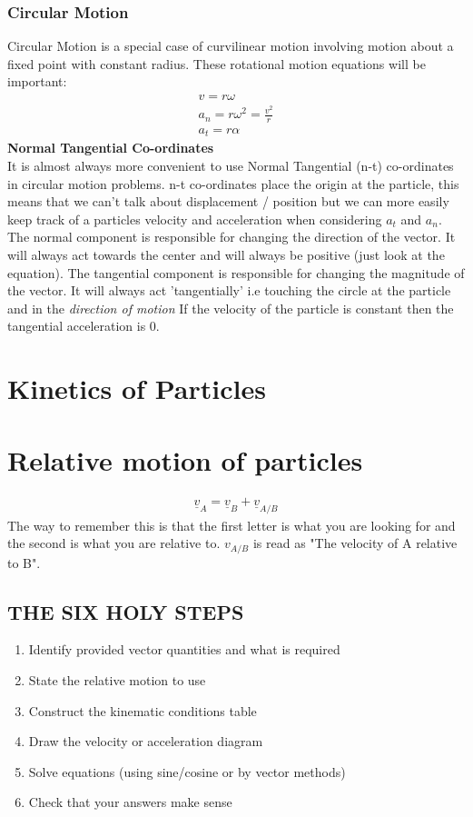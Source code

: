 \documentclass[a4paper, 12pt]{article}
\begin{document}
\subsubsection*{Circular Motion}
Circular Motion is a special case of curvilinear motion involving motion about a fixed point with constant radius. These rotational motion equations will be important:
\begin{align}
    v = r\omega \\
    a_n = r \omega^2 = \frac{v^2}{r} \\
    a_t = r\alpha 
\end{align}
\textbf{Normal Tangential Co-ordinates}
\\
\noindent
It is almost always more convenient to use Normal Tangential (n-t) co-ordinates in circular motion problems.
n-t co-ordinates place the origin at the particle, this means that we can't talk about displacement / position but
we can more easily keep track of a particles velocity and acceleration when considering $a_t$ and $a_n$.
\noindent
The normal component is responsible for changing the direction of the vector. 
It will always act towards the center and will always be positive (just look at the equation).
The tangential component is responsible for changing the magnitude of the vector. 
It will always act 'tangentially' i.e touching the circle at the particle and in the \textit{direction of motion}
If the velocity of the particle is constant then the tangential acceleration is 0.

\section*{Kinetics of Particles}

\section*{Relative motion of particles}
\begin{align*}
  \underline{v}_A = \underline{v}_B + \underline{v}_{A/B} 
\end{align*}
The way to remember this is that the first letter is what you are looking for and the second is what you are relative to. 
$v_{A/B}$ is read as "The velocity of A relative to B".
\subsection*{THE SIX HOLY STEPS}
\begin{enumerate}
    \item Identify provided vector quantities and what is required 
    \item State the relative motion to use 
    \item Construct the kinematic conditions table 
    \item Draw the velocity or acceleration diagram 
    \item Solve equations (using sine/cosine or by vector methods) 
    \item Check that your answers make sense
\end{enumerate}
\end{document}
